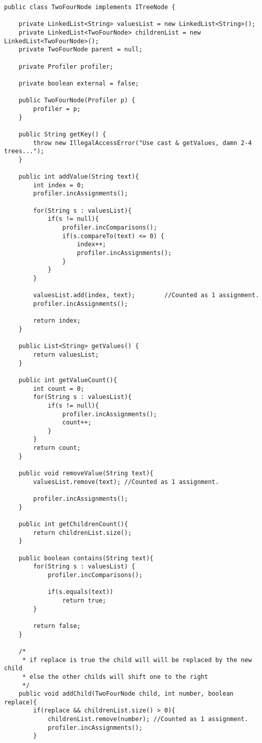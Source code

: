\begin{lstlisting}[caption=TwoFourTree classes Source code - TwoFourNode]
public class TwoFourNode implements ITreeNode {

	private LinkedList<String> valuesList = new LinkedList<String>();
	private LinkedList<TwoFourNode> childrenList = new LinkedList<TwoFourNode>();
	private TwoFourNode parent = null;
	
	private Profiler profiler;
	
	private boolean external = false;
	
	public TwoFourNode(Profiler p) {
		profiler = p;
	}
	
	public String getKey() {
		throw new IllegalAccessError("Use cast & getValues, damn 2-4 trees...");
	}
	
	public int addValue(String text){
		int index = 0;
		profiler.incAssignments();
		
		for(String s : valuesList){
			if(s != null){
				profiler.incComparisons();
				if(s.compareTo(text) <= 0) {
					index++;
					profiler.incAssignments();
				}
			}
		}
		
		valuesList.add(index, text); 		//Counted as 1 assignment.
		profiler.incAssignments();
		
		return index;
	}
	
	public List<String> getValues() {
		return valuesList;
	}
	
	public int getValueCount(){
		int count = 0;
		for(String s : valuesList){
			if(s != null){
				profiler.incAssignments();
				count++;
			}
		}
		return count;
	}
	
	public void removeValue(String text){
		valuesList.remove(text); //Counted as 1 assignment.
		
		profiler.incAssignments();
	}
	
	public int getChildrenCount(){
		return childrenList.size();
	}
	
	public boolean contains(String text){
		for(String s : valuesList) {
			profiler.incComparisons();
			
			if(s.equals(text))
				return true;
		}
		
		return false;
	}
	
	/*
	 * if replace is true the child will will be replaced by the new child
	 * else the other childs will shift one to the right
	 */
	public void addChild(TwoFourNode child, int number, boolean replace){		
		if(replace && childrenList.size() > 0){
			childrenList.remove(number); //Counted as 1 assignment.
			profiler.incAssignments();
		}
		

\end{lstlisting}
